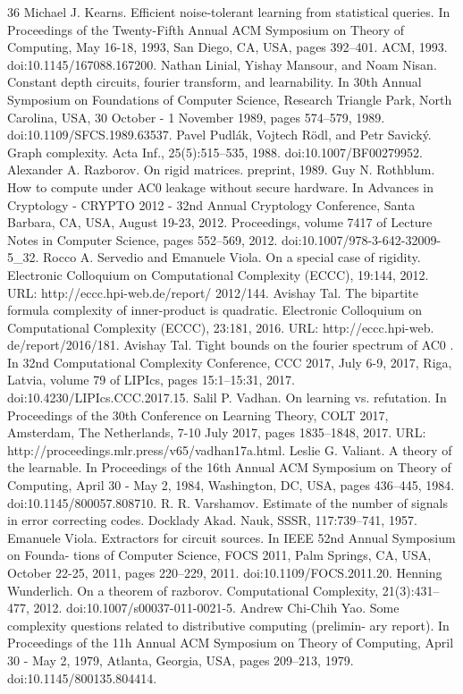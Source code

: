 \documentclass[10pt,a4paper]{article}
\begin{document}
\begin{thebibliography}{36}
Michael J. Kearns. Efficient noise-tolerant learning from statistical queries. In Proceedings of the Twenty-Fifth Annual ACM Symposium on Theory of Computing, May 16-18, 1993, San Diego, CA, USA, pages 392–401. ACM, 1993. doi:10.1145/167088.167200.
Nathan Linial, Yishay Mansour, and Noam Nisan. Constant depth circuits, fourier transform, and learnability. In 30th Annual Symposium on Foundations of Computer Science, Research Triangle Park, North Carolina, USA, 30 October - 1 November 1989, pages 574–579, 1989. doi:10.1109/SFCS.1989.63537.
Pavel Pudlák, Vojtech Rödl, and Petr Savický. Graph complexity. Acta Inf., 25(5):515–535, 1988. doi:10.1007/BF00279952.
Alexander A. Razborov. On rigid matrices. preprint, 1989.
Guy N. Rothblum. How to compute under AC0 leakage without secure hardware. In Advances in Cryptology - CRYPTO 2012 - 32nd Annual Cryptology Conference, Santa Barbara, CA, USA, August 19-23, 2012. Proceedings, volume 7417 of Lecture Notes in Computer Science, pages 552–569, 2012. doi:10.1007/978-3-642-32009-5\_32.
Rocco A. Servedio and Emanuele Viola. On a special case of rigidity. Electronic Colloquium on Computational Complexity (ECCC), 19:144, 2012. URL: http://eccc.hpi-web.de/report/ 2012/144.
Avishay Tal. The bipartite formula complexity of inner-product is quadratic. Electronic Colloquium on Computational Complexity (ECCC), 23:181, 2016. URL: http://eccc.hpi-web. de/report/2016/181.
Avishay Tal. Tight bounds on the fourier spectrum of AC0 . In 32nd Computational Complexity Conference, CCC 2017, July 6-9, 2017, Riga, Latvia, volume 79 of LIPIcs, pages 15:1–15:31, 2017. doi:10.4230/LIPIcs.CCC.2017.15.
Salil P. Vadhan. On learning vs. refutation. In Proceedings of the 30th Conference on Learning Theory, COLT 2017, Amsterdam, The Netherlands, 7-10 July 2017, pages 1835–1848, 2017. URL: http://proceedings.mlr.press/v65/vadhan17a.html.
Leslie G. Valiant. A theory of the learnable. In Proceedings of the 16th Annual ACM Symposium on Theory of Computing, April 30 - May 2, 1984, Washington, DC, USA, pages 436–445, 1984. doi:10.1145/800057.808710.
R. R. Varshamov. Estimate of the number of signals in error correcting codes. Docklady Akad. Nauk, SSSR, 117:739–741, 1957.
Emanuele Viola. Extractors for circuit sources. In IEEE 52nd Annual Symposium on Founda- tions of Computer Science, FOCS 2011, Palm Springs, CA, USA, October 22-25, 2011, pages 220–229, 2011. doi:10.1109/FOCS.2011.20.
Henning Wunderlich. On a theorem of razborov. Computational Complexity, 21(3):431–477, 2012. doi:10.1007/s00037-011-0021-5.
Andrew Chi-Chih Yao. Some complexity questions related to distributive computing (prelimin- ary report). In Proceedings of the 11h Annual ACM Symposium on Theory of Computing, April 30 - May 2, 1979, Atlanta, Georgia, USA, pages 209–213, 1979. doi:10.1145/800135.804414.
\end{thebibliography}
\end{document}
